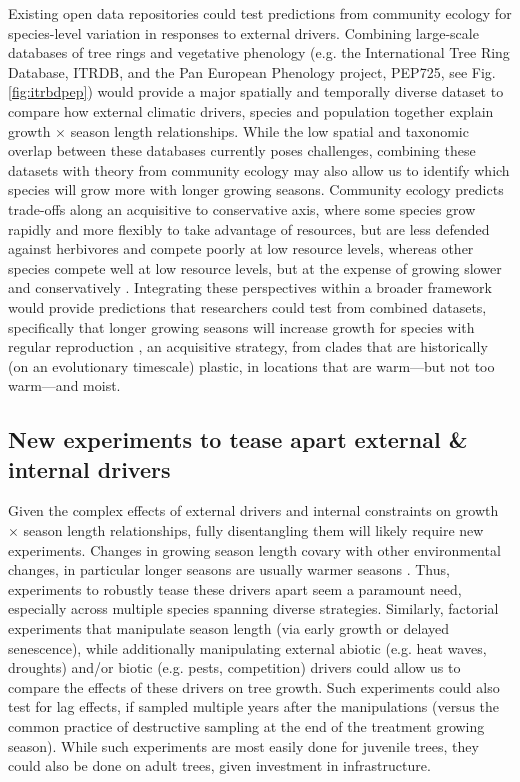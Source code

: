 Existing open data repositories could test predictions from community ecology for species-level variation in responses to external drivers. Combining large-scale databases of tree rings and vegetative phenology (e.g. the International Tree Ring Database, ITRDB, and the Pan European Phenology project, PEP725, see Fig. \ref{fig:itrbdpep}) would provide a major spatially and temporally diverse dataset to compare how external climatic drivers, species and population together explain growth $\times$ season length relationships. While the low spatial and taxonomic overlap between these databases currently poses challenges, combining these datasets with theory from community ecology may also allow us to identify which species will grow more with longer growing seasons. Community ecology predicts trade-offs along an acquisitive to conservative axis, where some species grow rapidly and more flexibly to take advantage of resources, but are less defended against herbivores and compete poorly at low resource levels, whereas other species compete well at low resource levels, but at the expense of growing slower and conservatively \citep[][]{Grime:1977sw}. Integrating these perspectives within a broader framework would provide predictions that researchers could test from combined datasets, specifically that longer growing seasons will increase growth for species with regular reproduction \citep[no masting, see also new masting database in][]{hacket2022mastree+}, an acquisitive strategy, from clades that are historically (on an evolutionary timescale) plastic, in locations that are warm---but not too warm---and moist. 


\subsection*{New experiments to tease apart external \& internal drivers}

Given the complex effects of external drivers and internal constraints on growth $\times$ season length relationships, fully disentangling them will likely require new experiments. Changes in growing season length covary with other environmental changes, in particular longer seasons are usually warmer seasons \citep{ipcc2021}. Thus, experiments to robustly tease these drivers apart seem a paramount need, especially across multiple species spanning diverse strategies. Similarly, factorial experiments that manipulate season length (via early growth or delayed senescence), while additionally manipulating external abiotic (e.g. heat waves, droughts) and/or biotic (e.g. pests, competition) drivers could allow us to compare the effects of these drivers on tree growth. Such experiments could also test for lag effects, if sampled multiple years after the manipulations (versus the common practice of destructive sampling at the end of the treatment growing season). While such experiments are most easily done for juvenile trees, they could also be done on adult trees, given investment in infrastructure. %

